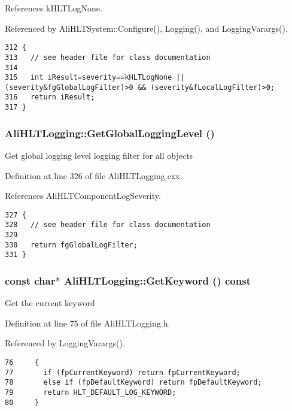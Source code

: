 References k\-HLTLog\-None.

Referenced by Ali\-HLTSystem::Configure(), Logging(), and Logging\-Varargs().

\footnotesize\begin{verbatim}312 {
313   // see header file for class documentation
314 
315   int iResult=severity==kHLTLogNone || (severity&fgGlobalLogFilter)>0 && (severity&fLocalLogFilter)>0;
316   return iResult;
317 }
\end{verbatim}\normalsize 


\subsubsection{ Ali\-HLTLogging::Get\-Global\-Logging\-Level ()\hspace{0.3cm}{\tt  [static]}}\label{classAliHLTLogging_e3}


Get global logging level logging filter for all objects 

Definition at line 326 of file Ali\-HLTLogging.cxx.

References Ali\-HLTComponent\-Log\-Severity.

\footnotesize\begin{verbatim}327 {
328   // see header file for class documentation
329 
330   return fgGlobalLogFilter;
331 }
\end{verbatim}\normalsize 


\subsubsection{\setlength{\rightskip}{0pt plus 5cm}const char$\ast$ Ali\-HLTLogging::Get\-Keyword () const\hspace{0.3cm}{\tt  [inline]}}\label{classAliHLTLogging_a6}


Get the current keyword 

Definition at line 75 of file Ali\-HLTLogging.h.

Referenced by Logging\-Varargs().

\footnotesize\begin{verbatim}76     {
77       if (fpCurrentKeyword) return fpCurrentKeyword;
78       else if (fpDefaultKeyword) return fpDefaultKeyword;
79       return HLT_DEFAULT_LOG_KEYWORD;
80     }
\end{verbatim}\normalsize 


